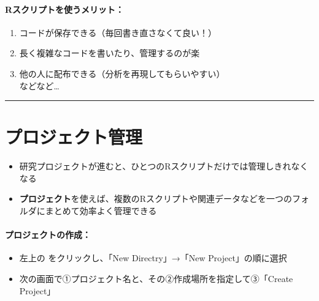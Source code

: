 \documentclass[
]{book}
\providecommand{\tightlist}{%
  \setlength{\itemsep}{0pt}\setlength{\parskip}{0pt}}
\begin{document}
\hypertarget{rux30b9ux30afux30eaux30d7ux30c8ux3092ux4f7fux3046ux30e1ux30eaux30c3ux30c8}{%
\paragraph*{Rスクリプトを使うメリット：}\label{rux30b9ux30afux30eaux30d7ux30c8ux3092ux4f7fux3046ux30e1ux30eaux30c3ux30c8}}

\begin{enumerate}
\def\labelenumi{\arabic{enumi}.}
\tightlist
\item
  コードが保存できる（毎回書き直さなくて良い！）
\item
  長く複雑なコードを書いたり、管理するのが楽\\
\item
  他の人に配布できる（分析を再現してもらいやすい）\\
  などなど\ldots{}
\end{enumerate}

\begin{center}\rule{0.5\linewidth}{0.5pt}\end{center}

\hypertarget{ux30d7ux30edux30b8ux30a7ux30afux30c8ux7ba1ux7406}{%
\section{プロジェクト管理}\label{ux30d7ux30edux30b8ux30a7ux30afux30c8ux7ba1ux7406}}

\begin{itemize}
\tightlist
\item
  研究プロジェクトが進むと、ひとつのRスクリプトだけでは管理しきれなくなる
\item
  \textbf{プロジェクト}を使えば、複数のRスクリプトや関連データなどを一つのフォルダにまとめて効率よく管理できる
\end{itemize}

\hypertarget{ux30d7ux30edux30b8ux30a7ux30afux30c8ux306eux4f5cux6210}{%
\paragraph*{プロジェクトの作成：}\label{ux30d7ux30edux30b8ux30a7ux30afux30c8ux306eux4f5cux6210}}

\begin{itemize}
\tightlist
\item
  左上の をクリックし、「New Directry」→「New Project」の順に選択\\
\item
  次の画面で①プロジェクト名と、その②作成場所を指定して③「Create Project」
\end{itemize}
\end{document}
